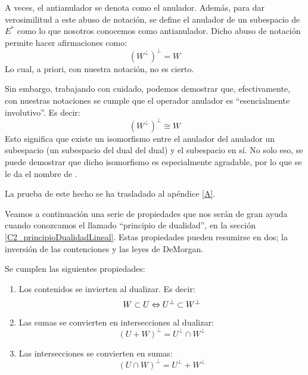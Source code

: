 \begin{obs}
	A veces, el antianulador se denota como el anulador. Además, para dar verosimilitud a este abuso de notación, se define el anulador de un subespacio de $E^*$ como lo que nosotros conocemos como antianulador. Dicho abuso de notación permite hacer afirmaciones como:
	\[(W^\perp)^\perp=W\]
	Lo cual, a priori, con nuestra notación, no es cierto.
	
	Sin embargo, trabajando con cuidado, podemos demostrar que, efectivamente, con nuestras notaciones se cumple que el operador anulador es ``esencialmente involutivo''. Es decir:
	\begin{equation}
		(W^\perp)^\perp\cong W
	\end{equation}
	Esto significa que existe un isomorfismo entre el anulador del anulador un subespacio (un subespacio del dual del dual) y el subespacio en sí. No solo eso, se puede demostrar que dicho isomorfismo es especialmente agradable, por lo que se le da el nombre de .
	
	La prueba de este hecho se ha trasladado al apéndice \ref{A}.
\end{obs}
Veamos a continuación una serie de propiedades que nos serán de gran ayuda cuando conozcamos el llamado ``principio de dualidad'', en la sección \ref{C2_principioDualidadLineal}. Estas propiedades pueden resumirse en dos; la inversión de las contenciones y las leyes de DeMorgan.
\begin{prop}
	\label{C2_pro_propiedades_dualidad}
	Se cumplen las siguientes propiedades:
	\begin{enumerate}
		\item Los contenidos se invierten al dualizar. Es decir: \[W\subset U\Leftrightarrow U^{\perp}\subset W^{\perp}\]
		\item Las sumas se convierten en intersecciones al dualizar:
		\[(U+W)^{\perp}=U^{\perp}\cap W^{\perp}\]
		\item Las intersecciones se convierten en sumas:
		\[(U\cap W)^{\perp}=U^{\perp}+ W^{\perp}\]
	\end{enumerate}
\end{prop}
